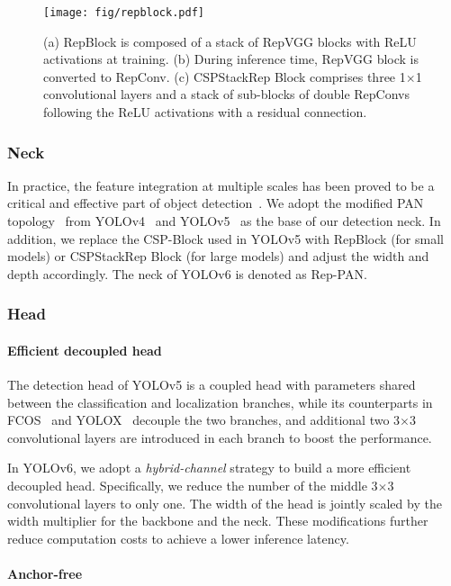 \documentclass[10pt,twocolumn,letterpaper]{article}
\begin{document}
\begin{figure}[htp]
  \centering
  \texttt{[image: fig/repblock.pdf]}
  \caption{(a) RepBlock is composed of a stack of RepVGG blocks with ReLU activations at training. (b) During inference time, RepVGG block is converted to RepConv. (c) CSPStackRep Block comprises three 1$\times$1 convolutional layers and a stack of sub-blocks of double RepConvs following the ReLU activations with a residual connection. }
  \label{fig:repblock}
\end{figure}
    
\subsubsection{Neck}
In practice, the feature integration at multiple scales has been proved to be a critical and effective part of object detection~\cite{lin2017feature, liu2018path, tan2020efficientdet, ghiasi2019fpn}. We adopt the modified PAN topology~\cite{liu2018path} from YOLOv4~\cite{bochkovskiy2020yolov4} and YOLOv5~\cite{yolov5} as the base of our detection neck. In addition, we replace the CSP-Block used in YOLOv5 with RepBlock (for small models) or CSPStackRep Block (for large models) and adjust the width and depth accordingly. The neck of YOLOv6 is denoted as Rep-PAN.

\subsubsection{Head}
  \paragraph{Efficient decoupled head} 
  The detection head of YOLOv5 is a coupled head with parameters shared between the classification and localization branches, while its counterparts in FCOS~\cite{tian2019fcos} and YOLOX~\cite{ge2021yolox} decouple the two branches, and additional two 3$\times$3 convolutional layers are introduced in each branch to boost the performance. 

  In YOLOv6, we adopt a \emph{hybrid-channel} strategy to build a more efficient decoupled head. Specifically, we reduce the number of the middle 3$\times$3 convolutional layers to only one. The width of the head is jointly scaled by the width multiplier for the backbone and the neck. These modifications further reduce computation costs to achieve a lower inference latency.


  \paragraph{Anchor-free}
\end{document}
